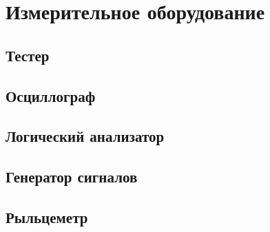 \section{Измерительное оборудование}

\subsection{Тестер}

\subsection{Осциллограф}

\subsection{Логический анализатор}

\subsection{Генератор сигналов}

\subsection{Рыльцеметр}


